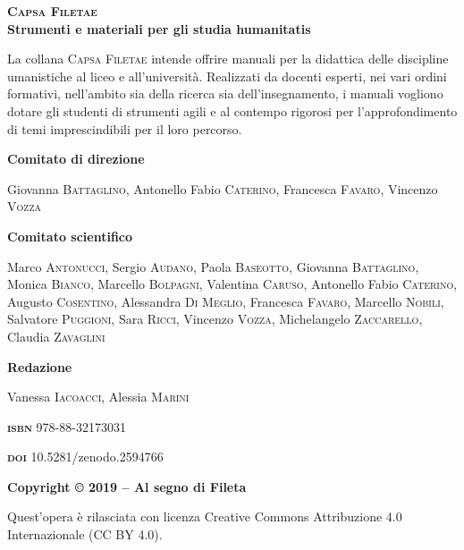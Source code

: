 \thispagestyle{empty}

\setlength{\parindent}{0pt}
\textbf{\textsc{\large{Capsa Filetae}}\\Strumenti e materiali per gli studia humanitatis}

La collana \textsc{Capsa Filetae} intende offrire manuali per la
didattica delle discipline umanistiche al liceo e all'università.
Realizzati da docenti esperti, nei vari ordini formativi, nell'ambito
sia della ricerca sia dell'insegnamento, i manuali vogliono dotare gli
studenti di strumenti agili e al contempo rigorosi per l'approfondimento
di temi imprescindibili per il loro percorso.

\vspace{2em}

\textbf{Comitato di direzione}

Giovanna \textsc{Battaglino}, Antonello Fabio \textsc{Caterino}, 
Francesca \textsc{Favaro}, Vincenzo \textsc{Vozza}

\vspace{2em}

\textbf{Comitato scientifico}

Marco \textsc{Antonucci}, Sergio \textsc{Audano,} Paola
\textsc{Baseotto}, Giovanna \textsc{Battaglino}, Monica \textsc{Bianco},
Marcello \textsc{Bolpagni}, Valentina \textsc{Caruso}, Antonello Fabio 
\textsc{Caterino}, Augusto \textsc{Cosentino}, Alessandra \textsc{Di}
\textsc{Meglio}, Francesca \textsc{Favaro}, Marcello \textsc{Nobili},
Salvatore \textsc{Puggioni}, Sara \textsc{Ricci}, Vincenzo
\textsc{Vozza}, Michelangelo \textsc{Zaccarello}, Claudia
\textsc{Zavaglini}


\vspace{2em}

\textbf{Redazione}

Vanessa \textsc{Iacoacci}, Alessia \textsc{Marini}


\vspace{2em}

\textbf{\textsc{isbn}} 978-88-32173031

\textbf{\textsc{doi}} 10.5281/zenodo.2594766

\vspace{1em}
\textbf{Copyright © 2019 -- Al segno di Fileta}

Quest'opera è rilasciata con licenza Creative Commons Attribuzione 4.0 Internazionale (CC BY 4.0). 

\pagebreak
\afterpage{\newpage}
\pagebreak
\thispagestyle{empty}
\phantom{~}
\newpage
\clearpage
\afterpage{\newpage}
\thispagestyle{empty}


\setlength{\parindent}{1em}


{
\setcounter{tocdepth}{0}
\tableofcontents
}

